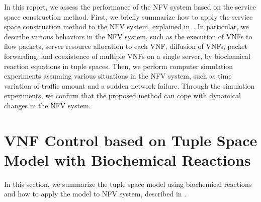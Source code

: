 \documentclass[technicalreport]{ieicej}
\begin{document}
	In this report, we assess the performance of the NFV system based on the service space construction method.
	First, we briefly summarize how to apply the service space construction method to the NFV system, explained in~\cite{kokisakata2018masterthesis}.
	In particular, we describe various behaviors in the NFV system, such as the execution of VNFs to flow packets, server resource allocation to each VNF, diffusion of VNFs, packet forwarding, and coexistence of multiple VNFs on a single server, by biochemical reaction equations in tuple spaces.
	Then, we perform computer simulation experiments assuming various situations in the NFV system, such as time variation of traffic amount and a sudden network failure.
	Through the simulation experiments, we confirm that the proposed method can cope with dynamical changes in the NFV system.



	\section{VNF Control based on Tuple Space Model with Biochemical Reactions}
	\label{sec:model}
	In this section, we summarize the tuple space model using biochemical reactions and how to apply the model to NFV system, described in \cite{kokisakata2018masterthesis}.
\end{document}
